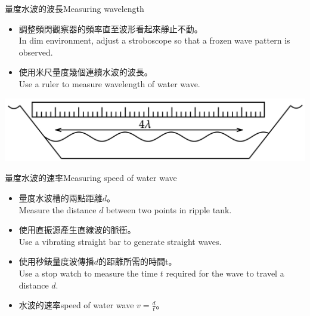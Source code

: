\documentclass[beamer=true]{standalone}
\begin{document}
\begin{frame}{量度水波的波長Measuring wavelength}
    \begin{itemize}
        \item 調整頻閃觀察器的頻率直至波形看起來靜止不動。\\In dim environment, adjust a stroboscope so that a frozen wave pattern is observed.
        \item 使用米尺量度幾個連續水波的波長。\\Use a ruler to measure wavelength of water wave.
    \end{itemize}\bigskip\bigskip
    \par{\par\centering\includegraphics[width=.75\textwidth]{./img/ch2_cf_2024-05-24-13-36-46.png}\par}

\end{frame}

\begin{frame}{量度水波的速率Measuring speed of water wave}
    \begin{itemize}
        \item 量度水波槽的兩點距離$d$。\\Measure the distance $d$ between two points in ripple tank.
        \item 使用直振源產生直線波的脈衝。\\Use a vibrating straight bar to generate straight waves.
        \item 使用秒錶量度波傳播$d$的距離所需的時間t。\\Use a stop watch to measure the time $t$ required for the wave to travel a distance $d$.
        \item 水波的速率speed of water wave \(v=\frac{d}{t}\)。
    \end{itemize}\bigskip
\end{frame}
\end{document}
